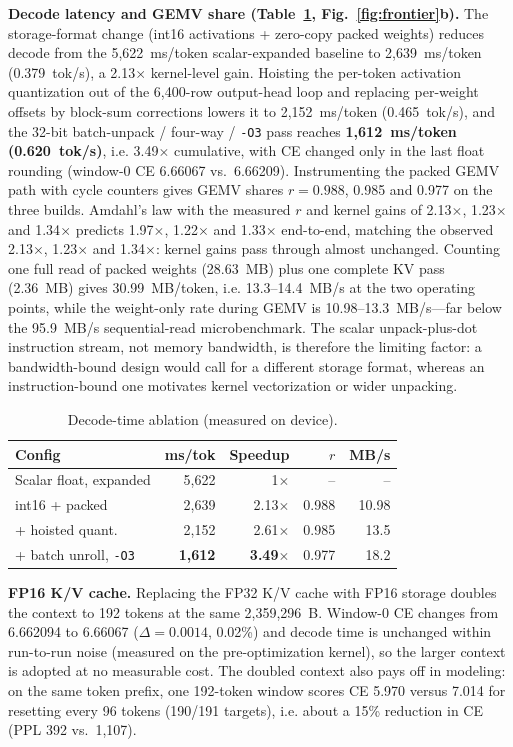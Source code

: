 \documentclass[journal,letterpaper]{IEEEtran}
\begin{document}
\textbf{Decode latency and GEMV share (Table~\ref{tab:gemv}, Fig.~\ref{fig:frontier}b).} The storage-format change
(int16 activations + zero-copy packed weights) reduces decode from the 5,622~ms/token
scalar-expanded baseline to 2,639~ms/token (0.379~tok/s), a 2.13$\times$ kernel-level gain.
Hoisting the per-token activation quantization out of the 6,400-row output-head loop and
replacing per-weight offsets by block-sum corrections lowers it to 2,152~ms/token (0.465~tok/s),
and the 32-bit batch-unpack / four-way / \texttt{-O3} pass reaches
\textbf{1,612~ms/token (0.620~tok/s)}, i.e. 3.49$\times$ cumulative, with CE changed only in the
last float rounding (window-0 CE 6.66067 vs.\ 6.66209). Instrumenting the packed GEMV path with
cycle counters gives GEMV shares $r=0.988$, 0.985 and 0.977 on the three builds. Amdahl's law
with the measured $r$ and kernel gains of 2.13$\times$, 1.23$\times$ and 1.34$\times$ predicts
1.97$\times$, 1.22$\times$ and 1.33$\times$ end-to-end, matching the observed 2.13$\times$,
1.23$\times$ and 1.34$\times$: kernel gains pass through almost unchanged. Counting one full read
of packed weights (28.63~MB) plus one complete KV pass (2.36~MB) gives 30.99~MB/token, i.e.
13.3--14.4~MB/s at the two operating points, while the weight-only rate during GEMV is
10.98--13.3~MB/s---far below the 95.9~MB/s sequential-read microbenchmark. The scalar
unpack-plus-dot instruction stream, not memory bandwidth, is therefore the limiting factor:
a bandwidth-bound design would call for a different storage format, whereas an
instruction-bound one motivates kernel vectorization or wider unpacking.

\begin{table}[t]
\centering
\caption{Decode-time ablation (measured on device).}
\label{tab:gemv}
\footnotesize
\setlength{\tabcolsep}{2.5pt}
\begin{tabular}{@{}lrrrr@{}}
\toprule
Config & ms/tok & Speedup & $r$ & MB/s \\
\midrule
Scalar float, expanded & 5,622 & 1$\times$ & -- & -- \\
int16 + packed & 2,639 & 2.13$\times$ & 0.988 & 10.98 \\
+ hoisted quant. & 2,152 & 2.61$\times$ & 0.985 & 13.5 \\
+ batch unroll, \texttt{-O3} & \textbf{1,612} & \textbf{3.49$\times$} & 0.977 & 18.2 \\
\bottomrule
\end{tabular}
\end{table}

\textbf{FP16 K/V cache.} Replacing the FP32 K/V cache with FP16 storage doubles the context to
192 tokens at the same 2,359,296~B. Window-0 CE changes from 6.662094 to 6.66067
($\Delta=0.0014$, 0.02\%) and decode time is unchanged within run-to-run noise (measured on the
pre-optimization kernel), so the larger context is adopted at no measurable cost. The doubled context also pays
off in modeling: on the same token prefix, one 192-token window scores CE 5.970 versus 7.014
for resetting every 96 tokens (190/191 targets), i.e. about a 15\% reduction in CE
(PPL 392 vs.\ 1,107).
\end{document}

